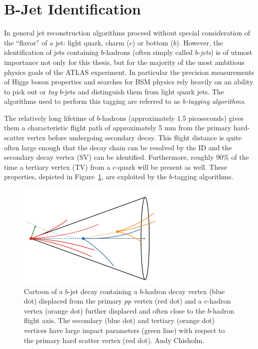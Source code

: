 \section{B-Jet Identification}
\label{sec:btagging}
In general jet reconstruction algorithms proceed without special consideration of the ``flavor'' of a jet: light quark, charm ($c$) or bottom ($b$).
However, the identification of jets containing $b$-hadrons (often simply called $b$-\textit{jets}) is of utmost importance not only for this thesis, but for the majority of the most ambitious physics goals of the ATLAS experiment.
In particular the precision measurements of Higgs boson properties and searches for BSM physics rely heavily on an ability to pick out or \textit{tag} $b$-jets and distinguish them from light quark jets. The algorithms used to perform this tagging are referred to as \textit{b-tagging algorithms}.

The relatively long lifetime of $b$-hadrons (approximately 1.5 picoseconds) gives them a characteristic flight path of approximately 5 mm from the primary hard-scatter vertex before undergoing secondary decay.
This flight distance is quite often large enough that the decay chain can be resolved by the ID and the secondary decay vertex (SV) can be identified.
Furthermore, roughly 90\% of the time a tertiary vertex (TV) from a $c$-quark will be present as well.
These properties, depicted in Figure~\ref{fig:b_decay_cartoon}, are exploited by the $b$-tagging algorithms.

\begin{figure}
	\centering
	\includegraphics[width=0.65\textwidth]{b_decay_cartoon}
	\caption{
	Cartoon of a $b$-jet decay containing a $b$-hadron decay vertex (blue dot) displaced from the primary $pp$ vertex (red dot) and a $c$-hadron vertex (orange dot) further displaced and often close to the $b$-hadron flight axis.
	The secondary (blue dot) and tertiary (orange dot) vertices have large impact parameters (green line) with respect to the primary hard scatter vertex (red dot).  Andy Chisholm.
	}
	\label{fig:b_decay_cartoon}
\end{figure}

